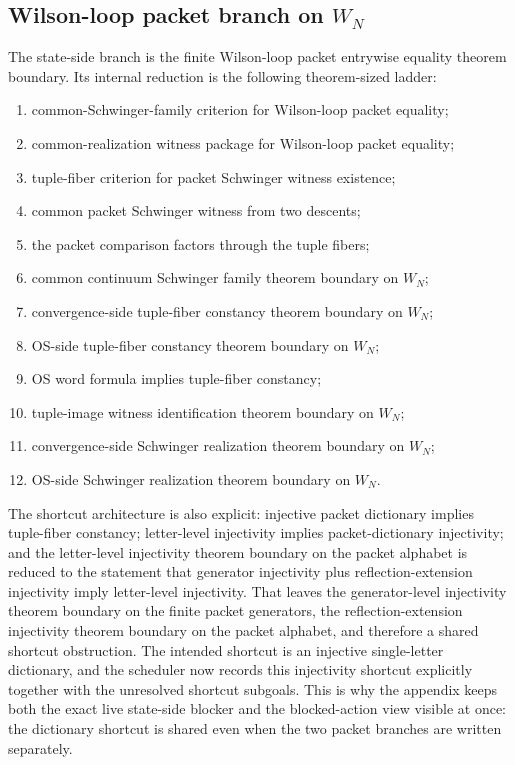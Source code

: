\subsection*{Wilson-loop packet branch on $W_N$}
The state-side branch is the finite Wilson-loop packet entrywise equality theorem boundary.
Its internal reduction is the following theorem-sized ladder:
\begin{enumerate}
\item common-Schwinger-family criterion for Wilson-loop packet equality;
\item common-realization witness package for Wilson-loop packet equality;
\item tuple-fiber criterion for packet Schwinger witness existence;
\item common packet Schwinger witness from two descents;
\item the packet comparison factors through the tuple fibers;
\item common continuum Schwinger family theorem boundary on $W_N$;
\item convergence-side tuple-fiber constancy theorem boundary on $W_N$;
\item OS-side tuple-fiber constancy theorem boundary on $W_N$;
\item OS word formula implies tuple-fiber constancy;
\item tuple-image witness identification theorem boundary on $W_N$;
\item convergence-side Schwinger realization theorem boundary on $W_N$;
\item OS-side Schwinger realization theorem boundary on $W_N$.
\end{enumerate}
The shortcut architecture is also explicit: injective packet dictionary implies tuple-fiber constancy; letter-level injectivity implies packet-dictionary injectivity; and the letter-level injectivity theorem boundary on the packet alphabet is reduced to the statement that generator injectivity plus reflection-extension injectivity imply letter-level injectivity. That leaves the
generator-level injectivity theorem boundary on the finite packet generators,
the reflection-extension injectivity theorem boundary on the packet alphabet,
and therefore a shared shortcut obstruction. The intended shortcut is an injective single-letter dictionary,
and the scheduler now records this injectivity shortcut explicitly together with the unresolved shortcut subgoals.
This is why the appendix keeps both the exact live state-side blocker and the
blocked-action view visible at once: the dictionary shortcut is shared even when
the two packet branches are written separately.

